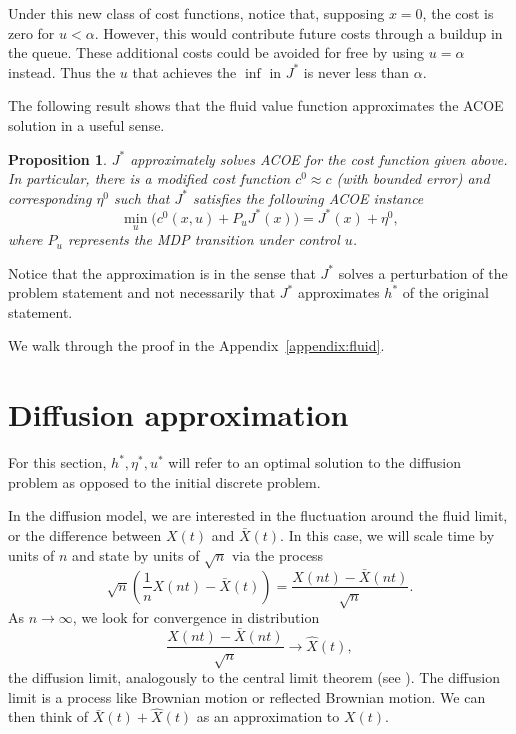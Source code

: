 \documentclass[11pt]{article}
\newtheorem{proposition}{Proposition}
\begin{document}
Under this new class of cost functions, notice that, supposing $x=0$, the cost is zero for $u<\alpha$. However, this would contribute future costs through a buildup in the queue. These additional costs could be avoided for free by using $u=\alpha$ instead. Thus the $u$ that achieves the $\inf$ in $J^*$ is never less than $\alpha$.

The following result shows that the fluid value function approximates the ACOE solution in a useful sense.

\begin{proposition}\label{prop:fluid_result}
$J^*$ approximately solves ACOE for the cost function given above. In particular, there is a modified cost function $c^0 \approx c$ (with bounded error) and corresponding $\eta^0$ such that $J^*$ satisfies the following ACOE instance
\begin{equation}\label{c0_ACOE}
\min_u \Big( c^0(x,u) + P_u J^*(x) \Big) = J^*(x) + \eta^0,
\end{equation}
where $P_u$ represents the MDP transition under control $u$.
\end{proposition}

Notice that the approximation is in the sense that $J^*$ solves a perturbation of the problem statement and not necessarily that $J^*$ approximates $h^*$ of the original statement.

We walk through the proof in the Appendix~\ref{appendix:fluid}.







\section{Diffusion approximation}\label{sec:diffusion}
For this section, $h^*, \eta^*, u^*$ will refer to an optimal solution to the diffusion problem as opposed to the initial discrete problem.

In the diffusion model, we are interested in the fluctuation around the fluid limit, or the difference between $X(t)$ and $\bar X(t)$. In this case, we will scale time by units of $n$ and state by units of $\sqrt{n}$ via the process
$$\sqrt{n} \left( \frac{1}{n} X(nt) - \bar X(t) \right) = \frac{X(nt) - \bar X(nt)}{\sqrt{n}}.$$
As $n\rightarrow \infty$, we look for convergence in distribution
$$\frac{X(nt) - \bar X(nt)}{\sqrt{n}} \rightarrow \hat X(t),$$
the diffusion limit, analogously to the central limit theorem (see \cite{lecture}). The diffusion limit is a process like Brownian motion or reflected Brownian motion. We can then think of $\bar X(t) + \hat X(t)$ as an approximation to $X(t)$.
\end{document}
